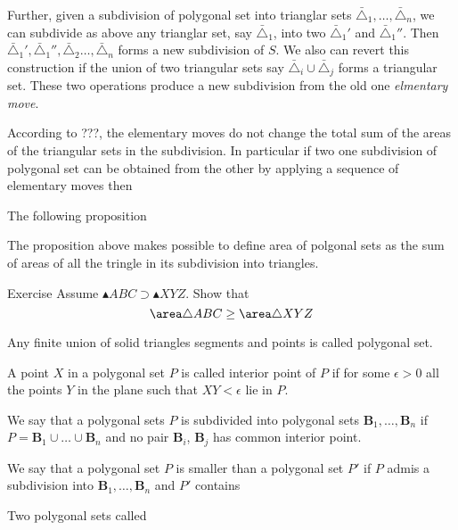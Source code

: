 Further, given a subdivision of polygonal set into trianglar sets $\bar\triangle_1,\dots,\bar\triangle_n$,
we can subdivide as above 
any trianglar set, say $\bar\triangle_1$,
into two $\bar\triangle_1'$ and $\bar\triangle_1''$.
Then 
$\bar\triangle_1',\bar\triangle_1'',\bar\triangle_2\dots,\bar\triangle_n$
forms a new subdivision of $S$.
We also can revert this construction if the union of two triangular sets 
say $\bar\triangle_i\cup \bar\triangle_j$ forms a triangular set.
These two operations produce a new subdivision from the old one \emph{elmentary move}.

According to ???,
the elementary moves do not change the total sum of the areas of the triangular sets in the subdivision.
In particular if two one subdivision of polygonal set can be obtained from the other by applying a sequence of elementary moves then 

The following proposition 



The proposition above makes possible to define area of polgonal sets
as the sum of areas of all the tringle in its subdivision into triangles.


\begin{thm}{Exercise}
Assume $\blacktriangle ABC\supset \blacktriangle XYZ$.
Show that 
\[\area \triangle ABC\ge \area \triangle XYZ\]

\end{thm}


Any finite union of solid triangles segments and points is called polygonal set.

A point $X$ in a polygonal set $P$ is called interior point of $P$ 
if for some $\epsilon>0$ all the points $Y$ in the plane such that $XY<\epsilon$ lie in $P$.

We say that a polygonal sets $P$ 
is subdivided into polygonal sets $\bm{B}_1,\dots, \bm{B}_n$
if $P=\bm{B}_1\cup\dots\cup \bm{B}_n$
and no pair $\bm{B}_i$, $\bm{B}_j$ has common interior point.

We say that a polygonal set $P$ 
is smaller than a polygonal set $P'$
if $P$ admis a subdivision into $\bm{B}_1,\dots, \bm{B}_n$
and $P'$ contains 

Two polygonal sets called 














